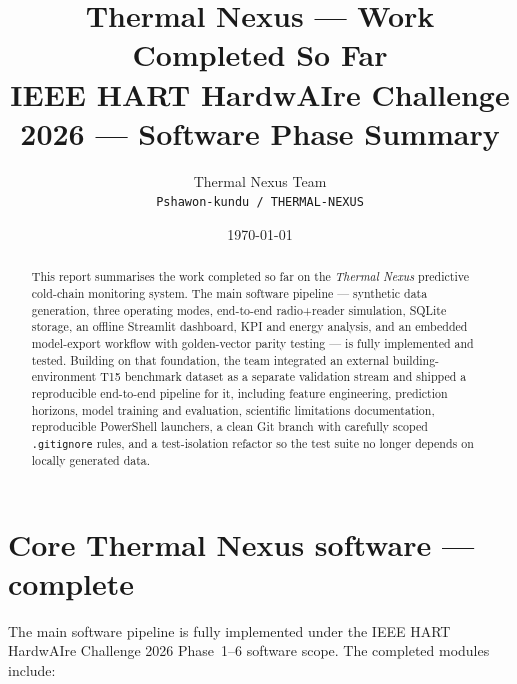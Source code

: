 \documentclass[11pt,a4paper]{article}
\title{\bfseries\Huge Thermal Nexus --- Work Completed So Far
       \vspace{4pt}\\[6pt]
       \large IEEE HART HardwAIre Challenge 2026 --- Software Phase Summary}
\author{Thermal Nexus Team \\ \small \texttt{Pshawon-kundu / THERMAL-NEXUS}}
\date{\today}
\begin{document}
\maketitle
\thispagestyle{fancy}

\begin{abstract}
\noindent
This report summarises the work completed so far on the
\emph{Thermal Nexus} predictive cold-chain monitoring system. The main
software pipeline --- synthetic data generation, three operating modes,
end-to-end radio+reader simulation, SQLite storage, an offline Streamlit
dashboard, KPI and energy analysis, and an embedded model-export workflow
with golden-vector parity testing --- is fully implemented and tested.
Building on that foundation, the team integrated an external
building-environment T15 benchmark dataset as a separate validation stream
and shipped a reproducible end-to-end pipeline for it, including feature
engineering, prediction horizons, model training and evaluation, scientific
limitations documentation, reproducible PowerShell launchers, a clean Git
branch with carefully scoped \texttt{.gitignore} rules, and a
test-isolation refactor so the test suite no longer depends on locally
generated data.
\end{abstract}

\vspace{1em}

\section{Core Thermal Nexus software --- complete}

The main software pipeline is fully implemented under the IEEE HART
HardwAIre Challenge 2026 Phase~1--6 software scope. The completed modules
include:
\end{document}
